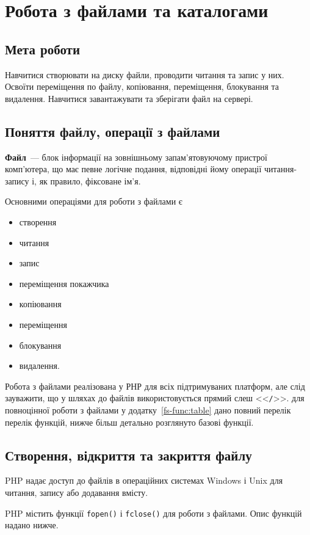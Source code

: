\chapter{Робота з файлами та каталогами}
\section*{Мета роботи}
Навчитися створювати на диску файли, проводити читання та запис у них. Освоїти переміщення по файлу, копіювання, переміщення, блокування та видалення. Навчитися завантажувати та зберігати файл на сервері.

\section{Поняття файлу, операції з файлами}
\textbf{Файл}~--- блок інформації на зовнішньому запам'ятовуючому пристрої комп'ютера, що має певне логічне подання, відповідні йому операції читання-запису і, як правило, фіксоване ім'я. 

Основними операціями для роботи з файлами є 
\begin{itemize}
\item створення
\item читання
\item запис
\item переміщення покажчика
\item копіювання
\item переміщення
\item блокування
\item видалення.
\end{itemize}

Робота з файлами реалізована у РНР для всіх підтримуваних платформ, але слід зауважити, що у шляхах до файлів використовується прямий слеш <<\verb'/'>>. для повноцінної роботи з файлами у додатку~\ref{fs-func:table} дано повний перелік перелік функцій, нижче більш детально розглянуто базові функції.
\section{Створення, відкриття та закриття файлу}
PHP надає доступ до файлів в операційних системах Windows і Unix для читання, запису або додавання вмісту. 

PHP містить функції \verb'fopen()' і \verb'fclose()' для роботи з файлами. Опис функцій надано нижче.


